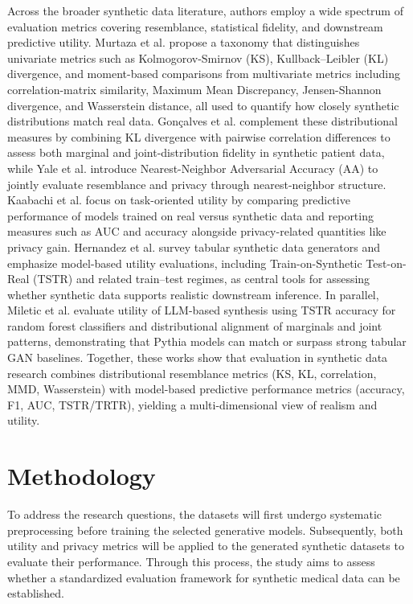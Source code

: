 \documentclass[master,proposal,extern,palatino]{rgseThesis}
\begin{document}
Across the broader synthetic data literature, authors employ a wide spectrum of evaluation metrics covering resemblance, statistical fidelity, and downstream predictive utility. Murtaza et al. \cite{Murtaza2023} propose a taxonomy that distinguishes univariate metrics such as Kolmogorov-Smirnov (KS), Kullback–Leibler (KL) divergence, and moment-based comparisons from multivariate metrics including correlation-matrix similarity, Maximum Mean Discrepancy, Jensen-Shannon divergence, and Wasserstein distance, all used to quantify how closely synthetic distributions match real data. Gonçalves et al. \cite{goncalves2020generation} complement these distributional measures by combining KL divergence with pairwise correlation differences to assess both marginal and joint-distribution fidelity in synthetic patient data, while Yale et al. \cite{healthgan} introduce Nearest-Neighbor Adversarial Accuracy (AA) to jointly evaluate resemblance and privacy through nearest-neighbor structure. Kaabachi et al. \cite{syninhospital} focus on task-oriented utility by comparing predictive performance of models trained on real versus synthetic data and reporting measures such as AUC and accuracy alongside privacy-related quantities like privacy gain. Hernandez et al. \cite{hernandez2022synthetic} survey tabular synthetic data generators and emphasize model-based utility evaluations, including Train-on-Synthetic Test-on-Real (TSTR) and related train–test regimes, as central tools for assessing whether synthetic data supports realistic downstream inference. In parallel, Miletic et al. \cite{Miletic2024} evaluate utility of LLM-based synthesis using TSTR accuracy for random forest classifiers and distributional alignment of marginals and joint patterns, demonstrating that Pythia models can match or surpass strong tabular GAN baselines. Together, these works show that evaluation in synthetic data research combines distributional resemblance metrics (KS, KL, correlation, MMD, Wasserstein) with model-based predictive performance metrics (accuracy, F1, AUC, TSTR/TRTR), yielding a multi-dimensional view of realism and utility.

\section{Methodology}
To address the research questions, the datasets will first undergo systematic preprocessing before training the selected generative models. Subsequently, both utility and privacy metrics will be applied to the generated synthetic datasets to evaluate their performance. Through this process, the study aims to assess whether a standardized evaluation framework for synthetic medical data can be established.
\end{document}
